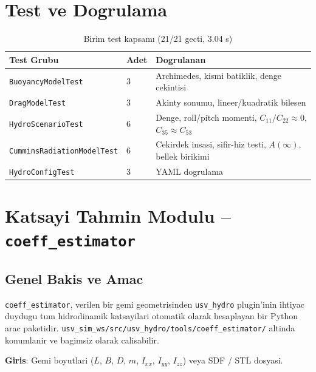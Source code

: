 \documentclass[12pt,a4paper]{article}
\begin{document}
\section{Test ve Dogrulama}

\begin{table}[H]
  \centering
  \caption{Birim test kapsamı (21/21 gecti, 3.04 s)}
  \begin{tabularx}{\linewidth}{llX}
    \toprule
    \textbf{Test Grubu} & \textbf{Adet} & \textbf{Dogrulanan} \\
    \midrule
    \texttt{BuoyancyModelTest}         & 3 & Archimedes, kismi batiklik, denge cekintisi \\
    \texttt{DragModelTest}             & 3 & Akinty sonumu, lineer/kuadratik bilesen \\
    \texttt{HydroScenarioTest}         & 6 & Denge, roll/pitch momenti, $C_{11}/C_{22}\approx0$, $C_{35}\approx C_{53}$ \\
    \texttt{CumminsRadiationModelTest} & 6 & Cekirdek insasi, sifir-hiz testi, $A(\infty)$, bellek birikimi \\
    \texttt{HydroConfigTest}           & 3 & YAML dogrulama \\
    \bottomrule
  \end{tabularx}
\end{table}

\section{Katsayi Tahmin Modulu -- \texttt{coeff\_estimator}}

\subsection{Genel Bakis ve Amac}

\texttt{coeff\_estimator}, verilen bir gemi geometrisinden
\texttt{usv\_hydro} plugin'inin ihtiyac duydugu tum hidrodinamik
katsayilari otomatik olarak hesaplayan bir Python arac paketidir.
\texttt{usv\_sim\_ws/src/usv\_hydro/tools/coeff\_estimator/} altinda
konumlanir ve bagimsiz olarak calisabilir.

\textbf{Giris}: Gemi boyutlari ($L$, $B$, $D$, $m$, $I_{xx}$, $I_{yy}$, $I_{zz}$)
veya SDF / STL dosyasi.
\end{document}
